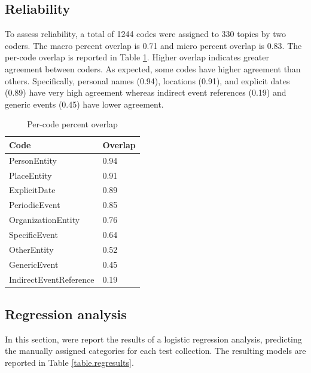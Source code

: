 \documentclass{sig-alternate}
\begin{document}
\subsection{Reliability}

To assess reliability, a total of 1244 codes were assigned to 330 topics by two coders. The macro percent overlap is 0.71 and  micro percent overlap is 0.83. The per-code overlap is reported in Table \ref{table.overlap}. Higher overlap indicates greater agreement between coders. As expected, some codes have higher agreement than others. Specifically, personal names (0.94), locations (0.91), and explicit dates (0.89) have very high agreement whereas indirect event references (0.19) and generic events (0.45) have lower agreement.

\begin{ignore}
\begin{table}
\small
\begin{tabular}{| l | l |} \hline
\bf{Code} & \bf{Overlap}  \\ \hline
PersonEntity & 0.94  \\ \hline
PlaceEntity  & 0.91  \\ \hline
ExplicitDate & 0.89   \\ \hline
PeriodicEvent & 0.85   \\ \hline
OrganizationEntity & 0.76  \\ \hline
SpecificEvent & 0.64  \\ \hline
OtherEntity & 0.52  \\ \hline
GenericEvent & 0.45  \\ \hline
IndirectEventReference & 0.19  \\ \hline
\end{tabular}
\caption{Per-code percent overlap }
\label{table.overlap}
\end{table}
\end{ignore}

\subsection{Regression analysis}

In this section, were report the results of a logistic regression analysis, predicting the manually assigned categories for each test collection. The resulting models are reported in Table \ref{table.regresults}. 
\end{document}
